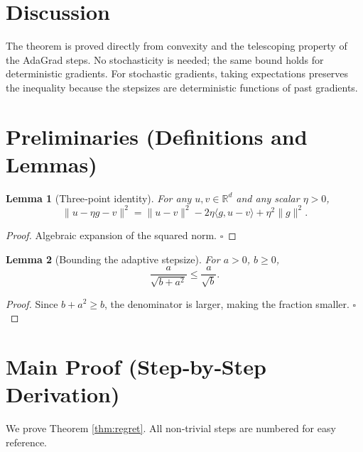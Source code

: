 \documentclass{article}
\newtheorem{lemma}{Lemma}
\begin{document}
\section*{Discussion}
The theorem is proved directly from convexity and the telescoping property of the AdaGrad steps. No stochasticity is needed; the same bound holds for deterministic gradients. For stochastic gradients, taking expectations preserves the inequality because the stepsizes are deterministic functions of past gradients.

\newpage
\section*{Preliminaries (Definitions and Lemmas)}
\begin{lemma}[Three‑point identity]\label{lem:three}
For any $u,v\in\mathbb{R}^{d}$ and any scalar $\eta>0$,
\[
\|u-\eta g - v\|^{2}= \|u-v\|^{2}-2\eta\langle g, u-v\rangle+\eta^{2}\|g\|^{2}.
\]
\end{lemma}
\begin{proof}
Algebraic expansion of the squared norm. \hfill $\square$
\end{proof}

\begin{lemma}[Bounding the adaptive stepsize]\label{lem:step}
For $a>0$, $b\ge 0$,
\[
\frac{a}{\sqrt{b+a^{2}}}\le\frac{a}{\sqrt{b}}.
\]
\end{lemma}
\begin{proof}
Since $b+a^{2}\ge b$, the denominator is larger, making the fraction smaller. \hfill $\square$
\end{proof}

\section*{Main Proof (Step‑by‑Step Derivation)}
We prove Theorem \ref{thm:regret}.  
All non‑trivial steps are numbered for easy reference.
\end{document}
